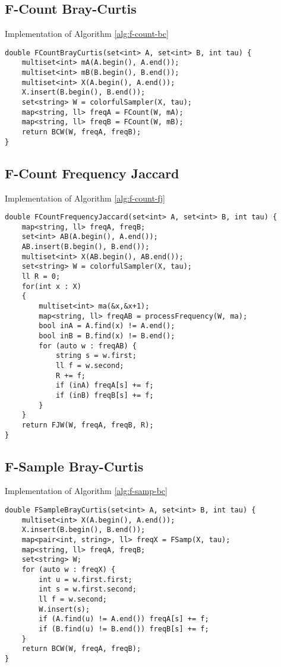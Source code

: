 \clearpage
\subsection*{F-Count Bray-Curtis}

Implementation of Algorithm \ref{alg:f-count-bc}
\begin{lstlisting}
double FCountBrayCurtis(set<int> A, set<int> B, int tau) {
	multiset<int> mA(A.begin(), A.end());
	multiset<int> mB(B.begin(), B.end());
	multiset<int> X(A.begin(), A.end());
	X.insert(B.begin(), B.end());
	set<string> W = colorfulSampler(X, tau);
	map<string, ll> freqA = FCount(W, mA);
	map<string, ll> freqB = FCount(W, mB);
	return BCW(W, freqA, freqB);
}
\end{lstlisting}

\subsection*{F-Count Frequency Jaccard}

Implementation of Algorithm \ref{alg:f-count-fj}
\begin{lstlisting}
double FCountFrequencyJaccard(set<int> A, set<int> B, int tau) {
	map<string, ll> freqA, freqB;
	set<int> AB(A.begin(), A.end());
	AB.insert(B.begin(), B.end());
	multiset<int> X(AB.begin(), AB.end());
	set<string> W = colorfulSampler(X, tau);
	ll R = 0;
	for(int x : X)
	{
		multiset<int> ma(&x,&x+1);
		map<string, ll> freqAB = processFrequency(W, ma);
		bool inA = A.find(x) != A.end();
		bool inB = B.find(x) != B.end();
		for (auto w : freqAB) {
			string s = w.first;
			ll f = w.second;
			R += f;
			if (inA) freqA[s] += f;
			if (inB) freqB[s] += f;
		}
	}
	return FJW(W, freqA, freqB, R);
}
\end{lstlisting}

\clearpage
\subsection*{F-Sample Bray-Curtis}

Implementation of Algorithm \ref{alg:f-samp-bc}
\begin{lstlisting}
double FSampleBrayCurtis(set<int> A, set<int> B, int tau) {
	multiset<int> X(A.begin(), A.end());
	X.insert(B.begin(), B.end());
	map<pair<int, string>, ll> freqX = FSamp(X, tau);
	map<string, ll> freqA, freqB;
	set<string> W;
	for (auto w : freqX) {
		int u = w.first.first;
		int s = w.first.second;
		ll f = w.second;
		W.insert(s);
		if (A.find(u) != A.end()) freqA[s] += f;
		if (B.find(u) != B.end()) freqB[s] += f;
	}
	return BCW(W, freqA, freqB);
}
\end{lstlisting}

